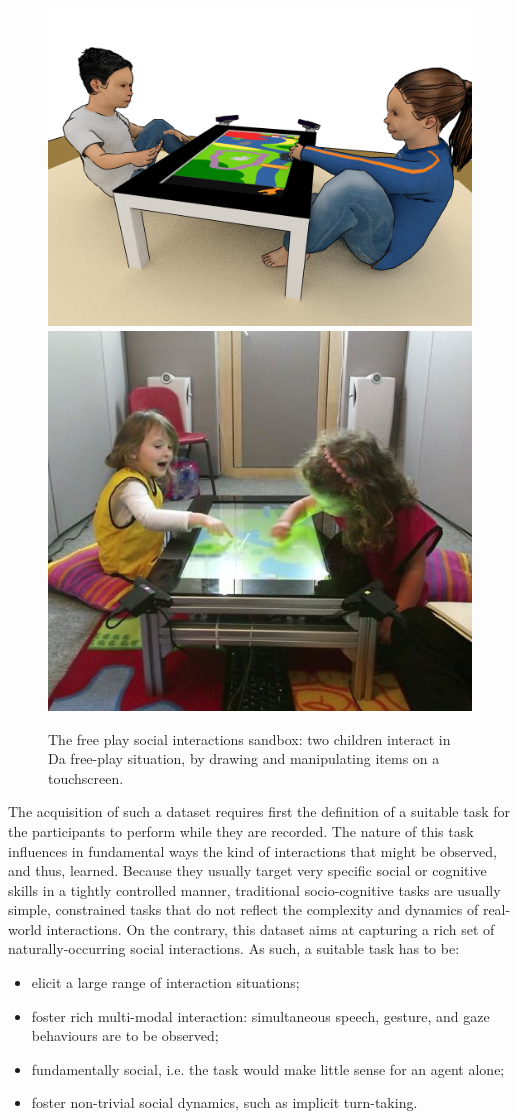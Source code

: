 \documentclass{article}
\newcommand{\ie}{i.e.\xspace}
\begin{document}
\begin{figure}
    \centering
    \includegraphics[width=0.4\linewidth]{setup-child-child.png}
    \hspace{1em}
    \includegraphics[width=0.4\linewidth]{child-child-env}
    \caption{The free play social interactions sandbox: two children interact in
    Da free-play situation, by drawing and manipulating items on a touchscreen.}
    \label{fig|setup}
\end{figure}

The acquisition of such a dataset requires first the definition of a suitable
task for the participants to perform while they are recorded. The nature of
this task influences in fundamental ways the kind of interactions that might be
observed, and thus, learned. Because they usually target very specific social
or cognitive skills in a tightly controlled manner, traditional socio-cognitive tasks are
usually simple, constrained tasks that do not reflect the complexity and dynamics of
real-world interactions. On the contrary, this dataset aims at capturing a rich set
of naturally-occurring social interactions. As such, a suitable task has to be:

\begin{itemize}
    \item elicit a large range of interaction situations;
    \item foster rich multi-modal interaction: simultaneous speech, gesture, and gaze
        behaviours are to be observed;
    \item fundamentally social, \ie the task would make little sense for an
        agent alone;
    \item foster non-trivial social dynamics, such as implicit turn-taking.
\end{itemize}
\end{document}
